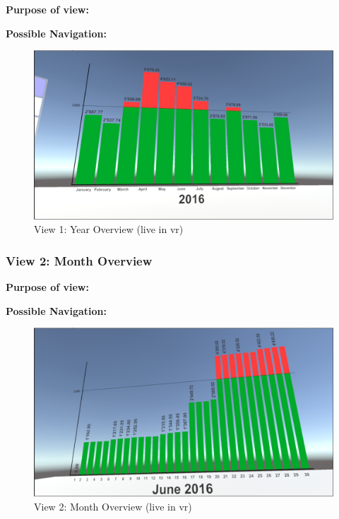 \textbf{Purpose of view:}


\textbf{Possible Navigation:}

\begin{figure}[h]
	\begin{center}
		\includegraphics[width=14cm]{03_Figures/08_Development/View1_YearOverview.png}
		\caption{View 1: Year Overview (live in \gls{vr})}
		\label{fig:unityview1}
	\end{center}
\end{figure}


\subsubsection{View 2: Month Overview}

\textbf{Purpose of view:}


\textbf{Possible Navigation:}

\begin{figure}[h]
	\begin{center}
		\includegraphics[width=14cm]{03_Figures/08_Development/View2_MonthOverview.png}
		\caption{View 2: Month Overview (live in \gls{vr})}
		\label{fig:unityview2}
	\end{center}
\end{figure}



